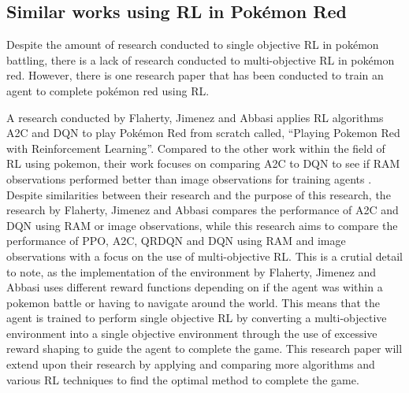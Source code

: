\subsection{Similar works using RL in Pokémon Red}

Despite the amount of research conducted to single objective RL in pokémon battling, there is a lack of research conducted to multi-objective RL in pokémon red. However, there is one research paper that has been conducted to train an agent to complete pokémon red using RL.

A research conducted by Flaherty, Jimenez and Abbasi applies RL algorithms A2C and DQN to play Pokémon Red  from scratch called, ``Playing Pokemon Red with Reinforcement Learning''\cite{flaherty2021playing}. Compared to the other work within the field of RL using pokemon, their work focuses on comparing A2C to DQN to see if RAM observations performed better than image observations for training agents \cite{flaherty2021playing}. Despite similarities between their research and the purpose of this research, the research by Flaherty, Jimenez and Abbasi compares the performance of A2C and DQN using RAM or image observations, while this research aims to compare the performance of PPO, A2C, QRDQN and DQN using RAM and image observations with a focus on the use of multi-objective RL. This is a crutial detail to note, as the implementation of the environment by Flaherty, Jimenez and Abbasi uses different reward functions depending on if the agent was within a pokemon battle or having to navigate around the world. This means that the agent is trained to perform single objective RL by converting a multi-objective environment into a single objective environment through the use of excessive reward shaping to guide the agent to complete the game. This research paper will extend upon their research by applying and comparing more algorithms and various RL techniques to find the optimal method to complete the game.


